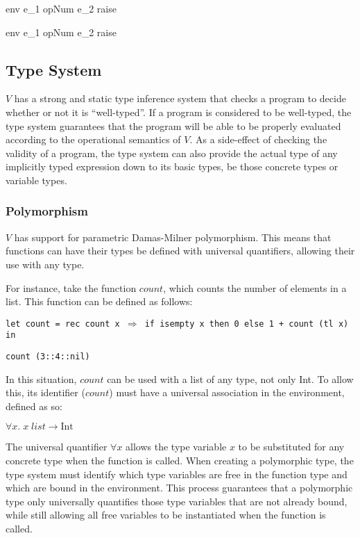 \documentclass{article}
\def\code#1{\begin{footnotesize}\texttt{#1}\end{footnotesize}}
\begin{document}
    {\mbox{env} \vdash e_1 opNum e_2 \Downarrow raise}

    {\mbox{env} \vdash e_1 opNum e_2 \Downarrow raise}

\subsection{Type System}\label{Type System}

$V$ has a strong and static type inference system that checks a program to decide whether or not it is "`well-typed"'.
If a program is considered to be well-typed, the type system guarantees that the program will be able to be properly evaluated according to the operational semantics of $V$.
As a side-effect of checking the validity of a program, the type system can also provide the actual type of any implicitly typed expression down to its basic types, be those concrete types or variable types.

\subsubsection{Polymorphism}\label{Polymorphism}

$V$ has support for parametric Damas\hyp Milner polymorphism.
This means that functions can have their types be defined with universal quantifiers, allowing their use with any type.

For instance, take the function $count$, which counts the number of elements in a list.
This function can be defined as follows:

\smallskip

\code{let count = rec count x $\Rightarrow$ if isempty x then 0 else 1 + count (tl x) in}

\code{count (3::4::nil)}

\smallskip

In this situation, $count$ can be used with a list of any type, not only Int.
To allow this, its identifier ($count$) must have a universal association in the environment, defined as so:

\smallskip
$\forall x. \; x \; list \rightarrow \mbox{Int}$
\smallskip

The universal quantifier $\forall x$ allows the type variable $x$ to be substituted for any concrete type when the function is called.
When creating a polymorphic type, the type system must identify which type variables are free in the function type and which are bound in the environment.
This process guarantees that a polymorphic type only universally quantifies those type variables that are not already bound, while still allowing all free variables to be instantiated when the function is called.
\end{document}
